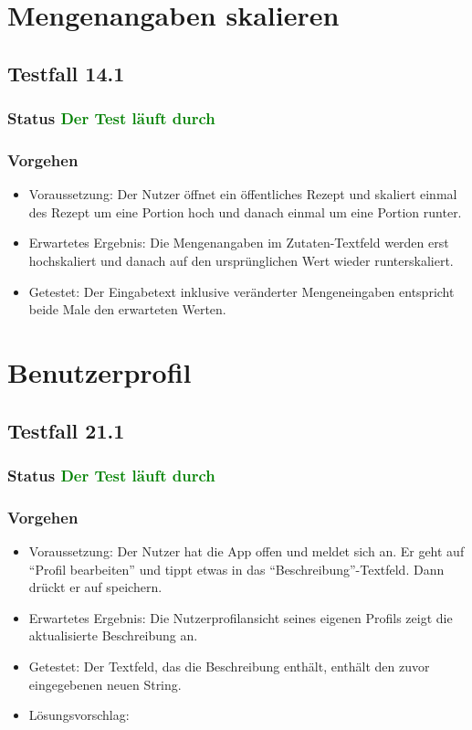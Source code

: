 \section{Mengenangaben skalieren}

\subsection{Testfall 14.1}
\subsubsection{Status \textcolor{green}{ Der Test läuft durch} }
\subsubsection{Vorgehen}
\begin{itemize}
\item Voraussetzung: Der Nutzer öffnet ein öffentliches Rezept und skaliert einmal des Rezept um eine Portion hoch und danach einmal um eine Portion runter.
\item Erwartetes Ergebnis: Die Mengenangaben im Zutaten-Textfeld werden erst hochskaliert und danach auf den ursprünglichen Wert wieder runterskaliert.
\item Getestet: Der Eingabetext inklusive veränderter Mengeneingaben entspricht beide Male den erwarteten Werten.
\end{itemize}



\section{Benutzerprofil}

\subsection{Testfall 21.1}
\subsubsection{Status \textcolor{green}{ Der Test läuft durch}}
\subsubsection{Vorgehen}
\begin{itemize}
\item Voraussetzung: Der Nutzer hat die App offen und meldet sich an. Er geht auf "`Profil bearbeiten"' und tippt etwas in das "`Beschreibung"'-Textfeld. Dann drückt er auf speichern.
\item Erwartetes Ergebnis: Die Nutzerprofilansicht seines eigenen Profils zeigt die aktualisierte Beschreibung an.
\item Getestet: Der Textfeld, das die Beschreibung enthält, enthält den zuvor eingegebenen neuen String.
\item Lösungsvorschlag:
\end{itemize}


